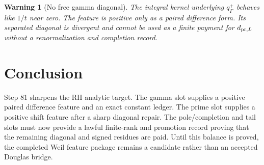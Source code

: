 \documentclass[11pt]{article}
\newtheorem{warning}{Warning}
\begin{document}
\begin{warning}[No free gamma diagonal]
The integral kernel underlying \(q^+_\Gamma\) behaves like \(1/t\) near zero.  The feature is positive only as a paired difference form.  Its separated diagonal is divergent and cannot be used as a finite payment for \(d_{{\rm pr},L}\) without a renormalization and completion record.
\end{warning}

\section{Conclusion}
Step 81 sharpens the RH analytic target.  The gamma slot supplies a positive paired difference feature and an exact constant ledger.  The prime slot supplies a positive shift feature after a sharp diagonal repair.  The pole/completion and tail slots must now provide a lawful finite-rank and promotion record proving that the remaining diagonal and signed residues are paid.  Until this balance is proved, the completed Weil feature package remains a candidate rather than an accepted Douglas bridge.
\end{document}
